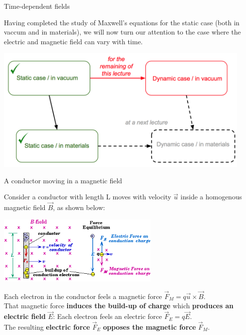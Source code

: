 \begin{frame}{Time-dependent fields}

Having completed the study of Maxwell's equations for the static case (both in vaccum and in materials),
we will now turn our attention to the case where the electric and magnetic field can vary with time.

\begin{center}
   \includegraphics[width=0.95\textwidth]{./images/schematics/maxwell_eq_variations.png}\\
\end{center}

\end{frame}

%
%
%

\begin{frame}{A conductor moving in a magnetic field}

Consider a conductor with length L moves with velocity $\vec{u}$ inside a
homogenous magnetic field $\vec{B}$, as shown below:

\begin{center}
  \includegraphics[width=0.60\textwidth]{./images/schematics/conductor_in_magnetic_field_induced_emf.png}\\
\end{center}

\vspace{0.1cm}
Each electron in the conductor feels a magnetic force $\vec{F}_{M} = q \vec{u} \times \vec{B}$.\\
\vspace{0.1cm}
That magnetic force {\bf induces the build-up of charge}
which {\bf produces an electric field} $\vec{E}$:
Each electron feels an electric force $\vec{F}_{E} = q \vec{E}$.\\
\vspace{0.2cm}
The resulting {\bf electric force} $\vec{F}_{E}$ {\bf opposes the magnetic force} $\vec{F}_{M}$.

\end{frame}

